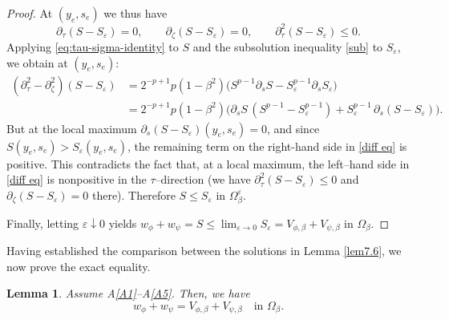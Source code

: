 \documentclass[
  sn-mathphys-num,
  colorlinks,
  linkcolor=darkmagenta,
  citecolor=rufous,
  urlcolor=zaffre,
  hypertexnames=false
]{sn-jnl}
\numberwithin{equation}{section}
\newtheorem{lemma}[theorem]{Lemma}%
\begin{document}
\begin{proof}
At $(y_e,s_e)$ we thus have
$$
\partial_\tau(S-S_\varepsilon)=0,\qquad \partial_\zeta(S-S_\varepsilon)=0,\qquad
\partial_\tau^2(S-S_\varepsilon)\le 0.
$$
Applying \eqref{eq:tau-sigma-identity} to $S$ and the subsolution inequality \eqref{sub} to $S_\varepsilon$, we obtain at $(y_e,s_e)$:
$$
\begin{aligned}\label{diff eq}
(\partial_\tau^2-\partial_\zeta^2)(S-S_\varepsilon)
&= 2^{-p+1}p(1-\beta^2)\Big(S^{p-1}\partial_s S - S_\varepsilon^{p-1}\partial_s S_\varepsilon\Big)\\
&= 2^{-p+1}p(1-\beta^2)\Big(\partial_s S\,(S^{p-1}-S_\varepsilon^{p-1})
+ S_\varepsilon^{p-1}\,\partial_s(S-S_\varepsilon)\Big).
\end{aligned}
$$
But at the local maximum $\partial_s(S-S_\varepsilon)(y_e,s_e)=0$, and since $S(y_e,s_e)>S_\varepsilon(y_e,s_e)$, the remaining term on the right-hand side in \eqref{diff eq} is positive. This contradicts the fact that, at a local maximum, the left–hand side in \eqref{diff eq} is nonpositive in the $\tau$–direction (we have $\partial_\tau^2(S-S_\varepsilon)\le 0$ and $\partial_\zeta(S-S_\varepsilon)=0$ there). Therefore $S\le S_\varepsilon$ in $\Omega_\beta^\varepsilon$. 

Finally, letting $\varepsilon\downarrow 0$ yields $w_\phi+w_\psi=S\le \lim_{\varepsilon\to 0}S_\varepsilon=V_{\phi,\beta}+V_{\psi,\beta}$ in $\Omega_\beta$.
\end{proof}


Having established the comparison between the solutions in Lemma \ref{lem7.6}, we now prove the exact equality.
\begin{lemma}\label{lem7.7}
Assume A\ref{A1}--A\ref{A5}. Then, we have
$$
w_\phi + w_\psi = V_{\phi, \beta} + V_{\psi, \beta} \quad \text{in } \Omega_\beta.
$$
\end{lemma}
\end{document}
